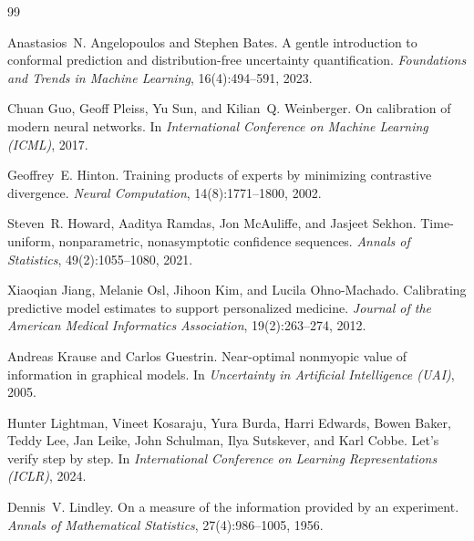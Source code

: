 \documentclass[11pt,a4paper]{article}
\theoremstyle{plain}
\theoremstyle{definition}
\theoremstyle{remark}
\begin{document}

\begin{thebibliography}{99}

Anastasios~N. Angelopoulos and Stephen Bates.
\newblock A gentle introduction to conformal prediction and
  distribution-free uncertainty quantification.
\newblock \emph{Foundations and Trends in Machine Learning},
  16(4):494--591, 2023.

Chuan Guo, Geoff Pleiss, Yu Sun, and Kilian~Q. Weinberger.
\newblock On calibration of modern neural networks.
\newblock In \emph{International Conference on Machine Learning
  (ICML)}, 2017.

Geoffrey~E. Hinton.
\newblock Training products of experts by minimizing contrastive
  divergence.
\newblock \emph{Neural Computation}, 14(8):1771--1800, 2002.

Steven~R. Howard, Aaditya Ramdas, Jon McAuliffe, and Jasjeet Sekhon.
\newblock Time-uniform, nonparametric, nonasymptotic confidence
  sequences.
\newblock \emph{Annals of Statistics}, 49(2):1055--1080, 2021.

Xiaoqian Jiang, Melanie Osl, Jihoon Kim, and Lucila Ohno-Machado.
\newblock Calibrating predictive model estimates to support
  personalized medicine.
\newblock \emph{Journal of the American Medical Informatics
  Association}, 19(2):263--274, 2012.

Andreas Krause and Carlos Guestrin.
\newblock Near-optimal nonmyopic value of information in graphical
  models.
\newblock In \emph{Uncertainty in Artificial Intelligence (UAI)},
  2005.

Hunter Lightman, Vineet Kosaraju, Yura Burda, Harri Edwards, Bowen
  Baker, Teddy Lee, Jan Leike, John Schulman, Ilya Sutskever, and
  Karl Cobbe.
\newblock Let's verify step by step.
\newblock In \emph{International Conference on Learning
  Representations (ICLR)}, 2024.

Dennis~V. Lindley.
\newblock On a measure of the information provided by an experiment.
\newblock \emph{Annals of Mathematical Statistics},
  27(4):986--1005, 1956.


\end{thebibliography}
\end{document}
